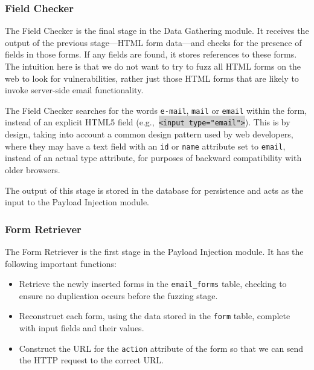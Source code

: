 \subsubsection{\Email Field Checker}
\label{Comp:EMFC}
The \Email Field Checker is the final stage in the Data Gathering module. It receives the output of the previous stage---HTML form data---and checks for the presence of \email fields in those forms. If any \email fields are found, it stores references to these forms.
The intuition here is that we do not want to try to fuzz all HTML forms on the web to look for \ehi vulnerabilities, rather just those HTML forms that are likely to invoke server-side email functionality.

The \Email Field Checker searches for the words \texttt{e-mail}, \texttt{mail} or \texttt{email} within the form, instead of an explicit HTML5 \email field (e.g.,\ \colorbox{lightgray}{\lstinline{<input type="email">}}). This is by design, taking into account a common design pattern used by web developers, where they may have a text field with an \texttt{id} or \texttt{name} attribute set to \texttt{email}, instead of an actual \email type attribute, for purposes of backward compatibility with older browsers.


The output of this stage is stored in the database for persistence and acts as the input to the Payload Injection module.

\subsubsection{\Email Form Retriever}
\label{Comp:EMFR}
The \Email Form Retriever is the first stage in the Payload Injection module. It has the following important functions:
\begin{itemize}
	\item Retrieve the newly inserted forms in the \texttt{email\_forms} table, checking to ensure no duplication occurs before the fuzzing stage.
	\item Reconstruct each form, using the data stored in the \texttt{form} table, complete with input fields and their values.
	\item Construct the URL for the \texttt{action} attribute of the form so that we can send the HTTP request to the correct URL. 
\end{itemize}

